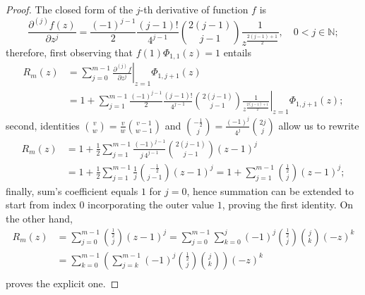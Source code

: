 \begin{proof}
The closed form of the $j$-th derivative of function $f$ is 
\begin{displaymath}
\frac{\partial^{(j)}{f}(z)}{\partial{z}^{j}} =\frac{(-1)^{j-1}}{2}\frac{(j-1)!}{4^{j-1}}{{2(j-1)}\choose{j-1}}\frac{1}{z^{\frac{2(j-1)+1}{2}}}, \quad 0 < j \in\mathbb{N};
\end{displaymath}
therefore, first observing that $f(1)\Phi_{1,1}(z)=1$ entails
\begin{displaymath}
\begin{split}
  R_{m}(z)  &= \sum_{j=0}^{m-1}{ \left. \frac{\partial^{(j)}{f}}{\partial{z}^{j}} \right|_{z=1}\Phi_{1,j+1}(z)}\\
            &= 1 + \sum_{j=1}^{m-1}{ \left. \frac{(-1)^{j-1}}{2}\frac{(j-1)!}{4^{j-1}}{{2(j-1)}\choose{j-1}}\frac{1}{z^{\frac{2(j-1)+1}{2}}} \right|_{z=1}\Phi_{1,j+1}(z)};
\end{split}
\end{displaymath}
second, identities ${ {v}\choose{w}} = \frac{v}{w} { {v-1}\choose{w-1} }$ and 
${ {-\frac{1}{2}}\choose{j} } = \frac{(-1)^{j}}{4^{j}}{ {2j}\choose{j} }$ allow us
to rewrite
\begin{displaymath}
\begin{split}
  R_{m}(z)  &= 1 + \frac{1}{2}\sum_{j=1}^{m-1}{ \frac{(-1)^{j-1}}{j\,4^{j-1}}{{2(j-1)}\choose{j-1}} \left(z-1\right)^{j}}\\
            &= 1 + \frac{1}{2}\sum_{j=1}^{m-1}{ \frac{1}{j}{-\frac{1}{2}\choose{j-1}} \left(z-1\right)^{j}}
             = 1 + \sum_{j=1}^{m-1}{ {\frac{1}{2}\choose{j}} \left(z-1\right)^{j}};
\end{split}
\end{displaymath}
finally, sum's coefficient equals $1$ for $j=0$, hence summation can be
extended to start from index $0$ incorporating the outer value $1$, proving the
first identity.  On the other hand,
\begin{displaymath}
\begin{split}
  R_{m}(z)  &= \sum_{j=0}^{m-1}{ {\frac{1}{2}\choose{j}} \left(z-1\right)^{j}}
             = \sum_{j=0}^{m-1}{\sum_{k=0}^{j}{(-1)^{j}{\frac{1}{2}\choose{j}}{ {j}\choose{k} } \left(-z\right)^{k}}}\\
            &= \sum_{k=0}^{m-1}{\left(\sum_{j=k}^{m-1}{(-1)^{j}{\frac{1}{2}\choose{j}}{ {j}\choose{k} } }\right)\left(-z\right)^{k}}\\
\end{split}
\end{displaymath}
proves the explicit one.
\end{proof}

